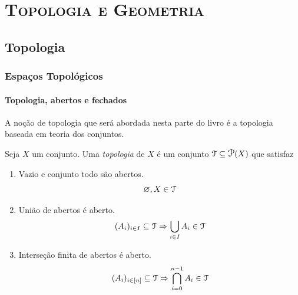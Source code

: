\part{{\scshape Topologia e Geometria}}

\chapter{Topologia}

\section{Espaços Topológicos}

\subsection{Topologia, abertos e fechados}

A noção de topologia que será abordada nesta parte do livro é a topologia baseada em teoria dos conjuntos.

\begin{defi}
	Seja $X$ um conjunto. Uma \emph{topologia} de $X$ é um conjunto $\topo \subseteq \p(X)$ que satisfaz
	\begin{enumerate}
	\item Vazio e conjunto todo são abertos.
	\begin{equation*}
	\varnothing, X \in \mathcal{T}
	\end{equation*}

	\item União de abertos é aberto.
	\begin{equation*}
	(A_i)_{i \in I} \subseteq \mathcal{T} \Rightarrow \displaystyle\bigcup_{i \in I} A_i \in \mathcal{T}
	\end{equation*}

	\item Interseção finita de abertos é aberto.
	\begin{equation*}
	(A_i)_{i \in [n]} \subseteq \mathcal T \Rightarrow \displaystyle\bigcap_{i=0}^{n-1} A_i \in \mathcal{T}
	\end{equation*}
	\end{enumerate}
\end{defi}

